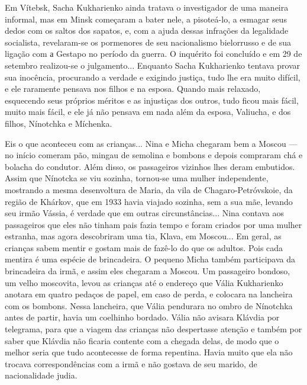 Em Vítebsk, Sacha Kukharienko ainda tratava o investigador de uma
maneira informal, mas em Minsk começaram a bater nele, a pisoteá-lo, a
esmagar seus dedos com os saltos dos sapatos, e, com a ajuda dessas
infrações da legalidade socialista, revelaram-se os pormenores de seu
nacionalismo bielorrusso e de sua ligação com а Gestapo no período da
guerra. O inquérito foi concluído e em 29 de setembro realizou-se o
julgamento... Enquanto Sacha Kukharienko tentava provar sua inocência,
procurando a verdade e exigindo justiça, tudo lhe era muito difícil, e
ele raramente pensava nos filhos e na esposa. Quando mais relaxado,
esquecendo seus próprios méritos e as injustiças dos outros, tudo ficou
mais fácil, muito mais fácil, e ele já não pensava em nada além da
esposa, Valiucha, e dos filhos, Nínotchka e Míchenka.

Eis o que aconteceu com as crianças... Nina e Micha chegaram bem a
Moscou --- no início comeram pão, mingau de semolina e bombons e depois
compraram chá e bolacha do condutor. Além disso, os passageiros vizinhos
lhes deram embutidos. Assim que Nínotcka se viu sozinha, tornou-se uma
mulher independente, mostrando a mesma desenvoltura de Maria, da vila de
Chagaro-Petróvskoie, da região de Khárkov, que em 1933 havia viajado
sozinha, sem a sua mãe, levando seu irmão Vássia, é verdade que em
outras circunstâncias... Nina contava aos passageiros que eles não
tinham pais fazia tempo e foram criados por uma mulher estranha, mas
agora descobriram uma tia, Klava, em Moscou... Em geral, as crianças
sabem mentir e gostam mais de fazê-lo do que os adultos. Pois cada
mentira é uma espécie de brincadeira. O pequeno Micha também participava
da brincadeira da irmã, e assim eles chegaram a Moscou. Um passageiro
bondoso, um velho moscovita, levou as crianças até o endereço que Vália
Kukharienko anotara em quatro pedaços de papel, em caso de perda, e
colocara na lancheira com os bombons. Nessa lancheira, que Vália
pendurara no ombro de Nínotchka antes de partir, havia um coelhinho
bordado. Vália não avisara Klávdia por telegrama, para que a viagem das
crianças não despertasse atenção e também por saber que Klávdia não
ficaria contente com a chegada delas, de modo que o melhor seria que
tudo acontecesse de forma repentina. Havia muito que ela não trocava
correspondências com a irmã e não gostava de seu marido, de
nacionalidade judia.

